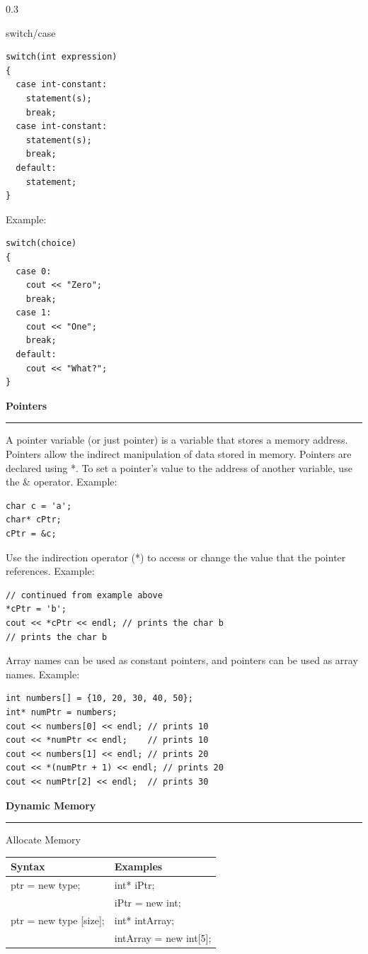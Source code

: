\documentclass[final]{beamer}
\renewcommand{\section}[1]{%
  \par\vspace{1em}%
  {\noindent\usebeamerfont{section title}\Large\bfseries #1\par}%
  \vspace{0.5em}\hrule\vspace{1em}%
}
\begin{document}
\begin{frame}[t,fragile]
\begin{columns}[t,totalwidth=0.95\paperwidth, colsep=0.05\paperwidth]
\begin{column}{0.3\paperwidth}
\begin{block}{\raggedright switch/case}
\begin{lstlisting}
switch(int expression)
{
  case int-constant:
    statement(s);
    break;
  case int-constant:
    statement(s);
    break;
  default:
    statement;
}
\end{lstlisting}
Example:
\begin{lstlisting}
switch(choice)
{ 
  case 0:
    cout << "Zero";
    break;
  case 1:
    cout << "One";
    break;
  default:
    cout << "What?";
}
\end{lstlisting}
\end{block}

\section{Pointers}
A pointer variable (or just pointer) is a variable that stores a memory address. Pointers allow the indirect manipulation of data stored in memory. Pointers are declared using *. To set a pointer's value to the address of another variable, use the \& operator.
Example:
\begin{lstlisting}
char c = 'a';
char* cPtr;
cPtr = &c;
\end{lstlisting}
Use the indirection operator (*) to access or change the value that the pointer references.
Example:
\begin{lstlisting}
// continued from example above
*cPtr = 'b';
cout << *cPtr << endl; // prints the char b
// prints the char b
\end{lstlisting}

Array names can be used as constant pointers, and pointers can be used as array names.
Example:
\begin{lstlisting}
int numbers[] = {10, 20, 30, 40, 50};
int* numPtr = numbers;
cout << numbers[0] << endl; // prints 10
cout << *numPtr << endl;    // prints 10
cout << numbers[1] << endl; // prints 20
cout << *(numPtr + 1) << endl; // prints 20
cout << numPtr[2] << endl;  // prints 30
\end{lstlisting}

\section{Dynamic Memory}


\begin{block}{\raggedright Allocate Memory}
\begin{tabular}{|l|l|}
\hline
\textbf{Syntax} & \textbf{Examples} \\
\hline
ptr = new type; & int* iPtr; \\
 & iPtr = new int; \\
\hline
ptr = new type [size]; & int* intArray; \\
 & intArray = new int[5]; \\
\hline
\end{tabular}
\end{block}


\end{column}
\end{columns}
\end{frame}
\end{document}
